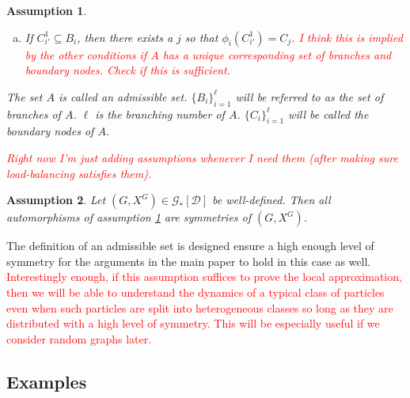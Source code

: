 \documentclass[12pt]{article}
\newcommand{\mc}{\mathcal}
\newcommand{\tr}{\textcolor{red}}
\newcommand{\ind}{\hspace{24pt}}
\newcommand{\cad}{\mc{D}}							%
\newcommand{\indx}[1]{^{#1}}						%
\newcommand{\Xf}{X}									%
\newcommand{\gind}[1]{^{#1}}						%
\newcommand{\psize}{\ell}							%
\newcommand{\Gs}{\mc{G}_\ast}						%
\renewcommand{\sp}[1]{[#1]}							%
\newtheorem{assu}{Assumption}
\begin{document}
\begin{assu}
\begin{enumerate}[(a)]
\item If \(C\indx{1}_{i'} \subseteq B_i\), then there exists a \(j\) so that \(\phi_i(C\indx{1}_{i'}) = C_j\). \tr{I think this is implied by the other conditions if \(A\) has a unique corresponding set of branches and boundary nodes. Check if this is sufficient.}
\end{enumerate}

The set \(A\) is called an admissible set. \(\{B_i\}_{i=1}^\psize\) will be referred to as the set of branches of \(A\). \(\psize\) is the branching number of \(A\). \(\{C_i\}_{i=1}^\psize\) will be called the boundary nodes of \(A\).

\ind \tr{Right now I'm just adding assumptions whenever I need them (after making sure load-balancing satisfies them).}
\label{a::admissible}
\end{assu}

\begin{assu}
Let \((G,\Xf\gind{G}) \in \Gs\sp{\cad}\) be well-defined. Then all automorphisms of assumption \ref{a::admissible} are symmetries of \((G,\Xf\gind{G})\).
\label{a::padmin}
\end{assu}

The definition of an admissible set is designed ensure a high enough level of symmetry for the arguments in the main paper to hold in this case as well. \tr{Interestingly enough, if this assumption suffices to prove the local approximation, then we will be able to understand the dynamics of a typical class of particles even when such particles are split into heterogeneous classes so long as they are distributed with a high level of symmetry. This will be especially useful if we consider random graphs later.}

\subsection{Examples}
\label{not::ex}
\end{document}
